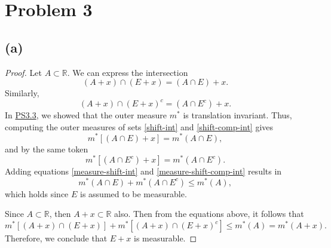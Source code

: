 \documentclass{article}
\begin{document}
\section*{Problem 3}
\subsection*{(a)}
\begin{proof}
	Let $A \subset \mathbb{R}$. We can express the intersection
	\begin{equation}\label{shift-int}
		(A+x) \cap (E+x) = (A\cap E) + x.
	\end{equation}
	Similarly,
	\begin{equation}\label{shift-comp-int}
		(A+x) \cap (E+x)^c = (A\cap E^c) + x.
	\end{equation}
	In \href{https://github.com/ovega14/FunctionalAnalysis_solutions/blob/main/PS3/18.102_ps3.pdf}{PS3.3}, we showed that the outer measure $m^*$ is translation invariant. Thus, computing the outer measures of sets \eqref{shift-int} and \eqref{shift-comp-int} gives
	\begin{equation}\label{measure-shift-int}
		m^*\left[(A\cap E) + x\right] = m^*(A\cap E),
	\end{equation}
	and by the same token
	\begin{equation}\label{measure-shift-comp-int}
		m^*\left[(A\cap E^c) + x\right] = m^*(A\cap E^c).
	\end{equation}
	Adding equations \eqref{measure-shift-int} and \eqref{measure-shift-comp-int} results in 
	\begin{equation}
		m^*(A\cap E) + m^*(A\cap E^c) \leq m^*(A),
	\end{equation}
	which holds since $E$ is assumed to be measurable.
	
	Since $A \subset \mathbb{R}$, then $A + x \subset \mathbb{R}$ also. Then from the equations above, it follows that
	\begin{equation}
		m^*\left[(A+x) \cap (E+x)\right] + m^*\left[(A+x) \cap (E+x)^c\right] \leq m^*(A) = m^*(A+x).
	\end{equation}
	Therefore, we conclude that $E+x$ is measurable. 
\end{proof}
\end{document}
